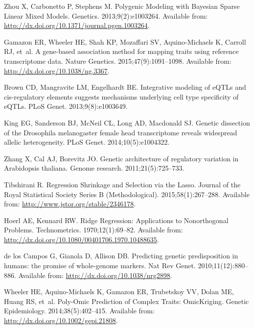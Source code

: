 \documentclass[10pt,letterpaper]{article}
\begin{document}
\begin{thebibliography}{10}
Zhou X, Carbonetto P, Stephens M.
\newblock Polygenic Modeling with Bayesian Sparse Linear Mixed Models.
 Genetics. 2013;9(2):e1003264.
\newblock Available from: \url{http://dx.doi.org/10.1371/journal.pgen.1003264}.

Gamazon ER, Wheeler HE, Shah KP, Mozaffari SV, Aquino-Michaels K, Carroll RJ,
  et~al.
\newblock A gene-based association method for mapping traits using reference
  transcriptome data.
\newblock Nature Genetics. 2015;47(9):1091--1098.
\newblock Available from: \url{http://dx.doi.org/10.1038/ng.3367}.

Brown CD, Mangravite LM, Engelhardt BE.
\newblock Integrative modeling of eQTLs and cis-regulatory elements suggests
  mechanisms underlying cell type specificity of eQTLs.
\newblock PLoS Genet. 2013;9(8):e1003649.

King EG, Sanderson BJ, McNeil CL, Long AD, Macdonald SJ.
\newblock Genetic dissection of the Drosophila melanogaster female head
  transcriptome reveals widespread allelic heterogeneity.
\newblock PLoS Genet. 2014;10(5):e1004322.

Zhang X, Cal AJ, Borevitz JO.
\newblock Genetic architecture of regulatory variation in Arabidopsis thaliana.
\newblock Genome research. 2011;21(5):725--733.

Tibshirani R.
\newblock Regression Shrinkage and Selection via the Lasso.
\newblock Journal of the Royal Statistical Society Series B (Methodological).
  2015;58(1):267--288.
\newblock Available from: \url{http://www.jstor.org/stable/2346178}.

Hoerl AE, Kennard RW.
\newblock Ridge Regression: Applications to Nonorthogonal Problems.
\newblock Technometrics. 1970;12(1):69--82.
\newblock Available from:
  \url{http://dx.doi.org/10.1080/00401706.1970.10488635}.

{de los Campos} G, Gianola D, Allison DB.
\newblock Predicting genetic predisposition in humans: the promise of
  whole-genome markers.
\newblock Nat Rev Genet. 2010;11(12):880--886.
\newblock Available from: \url{http://dx.doi.org/10.1038/nrg2898}.

Wheeler HE, Aquino-Michaels K, Gamazon ER, Trubetskoy VV, Dolan ME, Huang RS,
  et~al.
\newblock Poly-Omic Prediction of Complex Traits: {OmicKriging}.
\newblock Genetic Epidemiology. 2014;38(5):402--415.
\newblock Available from: \url{http://dx.doi.org/10.1002/gepi.21808}.


\end{thebibliography}
\end{document}
